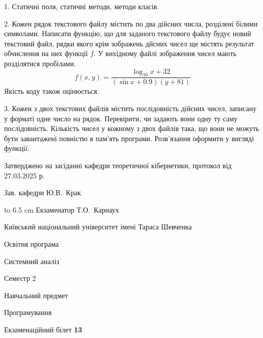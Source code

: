 \documentclass[12pt, ukrainian]{article}
\begin{document}
{%
1. Статичні поля, статичні методи, методи класів.%
\par
\vspace{2mm}

2. Кожен рядок текстового файлу містить по два дійсних числа, розділені білими символами.
Написати функцію, що для заданого текстового файлу будує новий текстовий файл, рядки якого крім зображень дйсних чисел ще містять результат обчислення на них функції $f$. У вихідному файлі зображення чисел мають розділятися пробілами. 
$$f(x, y) =\frac{\log_{10} x + 32}{(\sin x + 0.9) (y + 81)}$$ 
Якість коду також оцінюється.

\par
\vspace{2mm}

3. Кожен з двох текстових файлів містить послідовність дійсних чисел, записану у форматі одне число на рядок.  Перевірити, чи задають вони одну ту саму послідовність. Кількість чисел у кожному з двох файлів така, що вони не можуть бути завантажені повністю в пам'ять програми. Розв'язання оформити у вигляді функції.

}
{\smallskip\smallskip \begin {scriptsize} Затверджено на засіданні кафедри теоретичної кібернетики, протокол   від   27.03.2025 р.\par\smallskip\smallskip\smallskip\smallskip
{\parbox {6.5 cm} {Зав. кафедри \dotfill Ю.В.~Крак}}\hspace {0.7cm} {\hbox to 6.5 cm { Екзаменатор \dotfill Т.О.~Карнаух}} \end{scriptsize}}
\newpage
{{\begin {scriptsize}\par
{ \center  Київський національний університет імені Тараса Шевченка \par}
{\parbox {5 cm}{Освітня програма \hfill}{\parbox {7 cm}{Системний аналіз\hfill}}\parbox {6 cm}{\hfill Семестр 2}}\par
{\parbox {5 cm} {Навчальний предмет \hfill}\parbox {7 cm}{Програмування \hfill}\parbox {6cm}{\hfill}\par}\vspace{-15pt} \end{scriptsize}}{\center Екзаменаційний білет \No \textbf { 13 }\par}}
\end{document}
